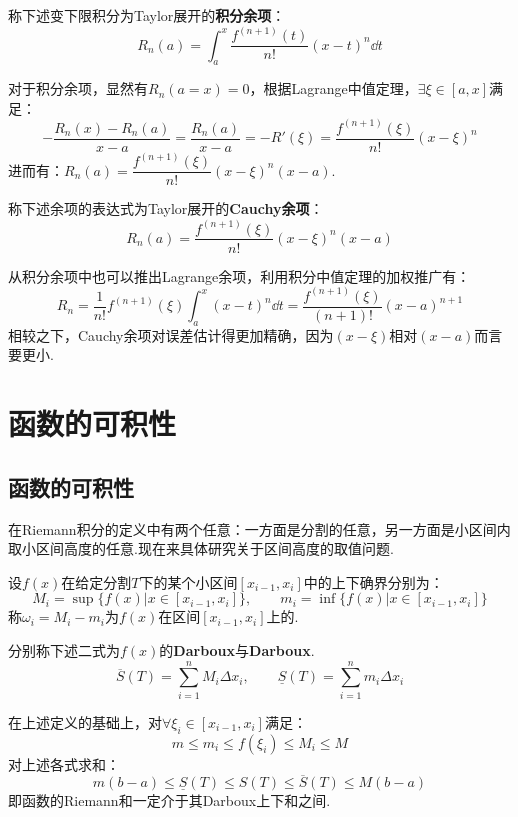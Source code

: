 \begin{definition}
    称下述变下限积分为Taylor展开的\textbf{积分余项}：
    \[R_n(a) = \int_{a}^{x}\frac{f^{(n+1)}(t)}{n!}(x-t)^n\dd{t}\]
\end{definition}

对于积分余项，显然有$R_n(a=x) = 0$，根据Lagrange中值定理，$\exists \xi \in [a,x]$满足：
\[-\frac{R_n(x) - R_n(a)}{x-a} = \frac{R_n(a)}{x-a} = -R'(\xi) = \frac{f^{(n+1)}(\xi)}{n!}(x-\xi)^n\]
进而有：$R_n(a) = \dfrac{f^{(n+1)}(\xi)}{n!}(x-\xi)^n(x-a)$.

\begin{definition}
    称下述余项的表达式为Taylor展开的\textbf{Cauchy余项}：
    \[R_n(a) = \dfrac{f^{(n+1)}(\xi)}{n!}(x-\xi)^n(x-a)\]
\end{definition}

从积分余项中也可以推出Lagrange余项，利用积分中值定理的加权推广有：
\[R_n = \frac{1}{n!}f^{(n+1)}(\xi)\int_{a}^{x}(x-t)^n\dd{t} = \frac{f^{(n+1)}(\xi)}{(n+1)!}(x-a)^{n+1}\]
相较之下，Cauchy余项对误差估计得更加精确，因为$(x-\xi)$相对$(x-a)$而言要更小.


\section{函数的可积性}
\subsection{函数的可积性}
在Riemann积分的定义中有两个任意：一方面是分割的任意，另一方面是小区间内取小区间高度的任意.现在来具体研究关于区间高度的取值问题.

\begin{definition}
    设$f(x)$在给定分割$T$下的某个小区间$[x_{i-1},x_i]$中的上下确界分别为：
    \[M_i = \sup\{f(x)|x\in[x_{i-1},x_i]\},\qquad m_i = \inf\{f(x)|x\in[x_{i-1},x_i]\}\]
    称$\omega_i = M_i - m_i$为$f(x)$在区间$[x_{i-1},x_i]$上的.
\end{definition}

\begin{definition}
    分别称下述二式为$f(x)$的\textbf{Darboux}与\textbf{Darboux}.
    \[\overline{S}(T) = \sum_{i=1}^{n}M_i \Delta x_i, \qquad \underline{S}(T) = \sum_{i=1}^{n}m_i \Delta x_i\]
\end{definition}

在上述定义的基础上，对$\forall \xi_i \in [x_{i-1},x_i]$满足：
\[m \leqslant m_i \leqslant f(\xi_i) \leqslant M_i \leqslant M\]
对上述各式求和：
\[m(b-a) \leqslant \underline{S}(T) \leqslant S(T) \leqslant \overline{S}(T) \leqslant M(b-a)\]
即函数的Riemann和一定介于其Darboux上下和之间.

